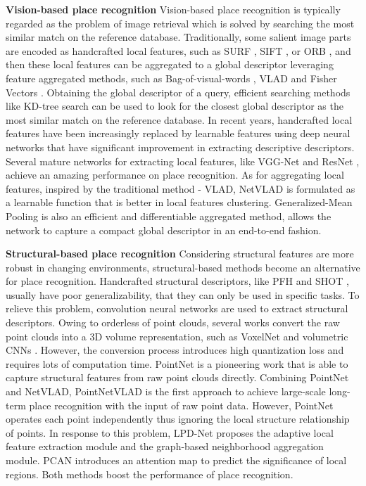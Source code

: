 \documentclass[letterpaper, 10 pt, conference]{ieeeconf}  \usepackage{tabularx}
\begin{document}
\textbf{Vision-based place recognition} Vision-based place recognition is typically regarded as the problem of image retrieval which is solved by searching the most similar match on the reference database. Traditionally, some salient image parts are encoded as handcrafted local features, such as SURF \cite{bay2008speeded}, SIFT \cite{lowe2004distinctive}, or ORB \cite{mur2015orb, mur2017orb}, and then these local features can be aggregated to a global descriptor leveraging feature aggregated methods, such as Bag-of-visual-words \cite{galvez2012bags}, VLAD \cite{jegou2010aggregating} and Fisher Vectors \cite{jegou2011aggregating}. Obtaining the global descriptor of a query, efficient searching methods like KD-tree search can be used to look for the closest global descriptor as the most similar match on the reference database. In recent years, handcrafted local features have been increasingly replaced by learnable features using deep neural networks that have significant improvement in extracting descriptive descriptors. Several mature networks for extracting local features, like VGG-Net \cite{simonyan2014very} and ResNet \cite{he2016deep}, achieve an amazing performance on place recognition. As for aggregating local features, inspired by the traditional method - VLAD, NetVLAD \cite{arandjelovic2016netvlad} is formulated as a learnable function that is better in local features clustering. Generalized-Mean Pooling \cite{radenovic2018fine} is also an efficient and differentiable aggregated method, allows the network to capture a compact global descriptor in an end-to-end fashion.
	
\textbf{Structural-based place recognition} Considering structural features are more robust in changing environments, structural-based methods become an alternative for place recognition. Handcrafted structural descriptors, like PFH \cite{rusu2008aligning} and SHOT \cite{salti2014shot}, usually have poor generalizability, that they can only be used in speciﬁc tasks. To relieve this problem, convolution neural networks are used to extract structural descriptors. Owing to orderless of point clouds, several works convert the raw point clouds into a 3D volume representation, such as VoxelNet \cite{zhou2018voxelnet} and volumetric CNNs \cite{qi2016volumetric}. However, the conversion process introduces high quantization loss and requires lots of computation time. PointNet \cite{qi2017pointnet} is a pioneering work that is able to capture structural features from raw point clouds directly. Combining PointNet and NetVLAD, PointNetVLAD \cite{angelina2018pointnetvlad} is the first approach to achieve large-scale long-term place recognition with the input of raw point data. However, PointNet operates each point independently thus ignoring the local structure relationship of points. In response to this problem, LPD-Net \cite{liu2019lpd} proposes the adaptive local feature extraction module and the graph-based neighborhood aggregation module. PCAN \cite{zhang2019pcan} introduces an attention map to predict the significance of local regions. Both methods boost the performance of place recognition.
\end{document}
